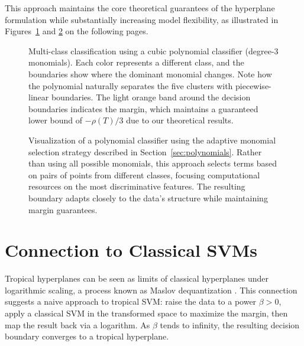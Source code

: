 \documentclass{article}
\begin{document}
This approach maintains the core theoretical guarantees of the hyperplane formulation while substantially increasing model flexibility, as illustrated in Figures~\ref{fig:homogeneous_selection} and \ref{fig:adaptive_polynomial} on the following pages.

\newpage

\vspace*{3em}
\begin{figure}[ht!]
    \centering
    \resizebox{0.7\textwidth}{!}{\clipbox{0.15\width{} 0.30\height{} 0.15\width{} 0.30\height{}}{}}
    \caption{Multi-class classification using a cubic polynomial classifier (degree-3 monomials). Each color represents a different class, and the boundaries show where the dominant monomial changes. Note how the polynomial naturally separates the five clusters with piecewise-linear boundaries. The light orange band around the decision boundaries indicates the margin, which maintains a guaranteed lower bound of $-\rho(T)/3$ due to our theoretical results.}
    \label{fig:homogeneous_selection}
\end{figure}
\vspace*{4em}
\begin{figure}[ht!]
    \centering
    \resizebox{0.7\textwidth}{!}{\clipbox{0.15\width{} 0.30\height{} 0.15\width{} 0.30\height{}}{}}
    \caption{Visualization of a polynomial classifier using the adaptive monomial selection strategy described in Section~\ref{sec:polynomials}. Rather than using all possible monomials, this approach selects terms based on pairs of points from different classes, focusing computational resources on the most discriminative features. The resulting boundary adapts closely to the data's structure while maintaining margin guarantees.}
    \label{fig:adaptive_polynomial}
\end{figure}
\vspace*{3em}


\newpage
\section{Connection to Classical SVMs}\label{sec:maslov}
Tropical hyperplanes can be seen as limits of classical hyperplanes under logarithmic scaling, a process known as Maslov dequantization \cite{viro2001}. This connection suggests a naive approach to tropical SVM: raise the data to a power $\beta > 0$, apply a classical SVM in the transformed space to maximize the margin, then map the result back via a logarithm. As $\beta$ tends to infinity, the resulting decision boundary converges to a tropical hyperplane.
\end{document}
